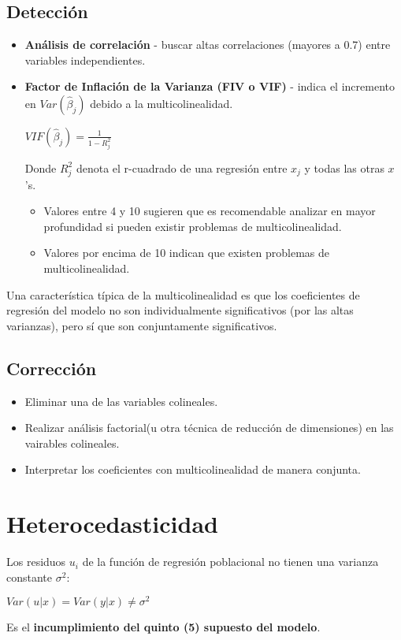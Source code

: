 \documentclass[10pt, a4paper, landscape]{extarticle}
\begin{document}
\begin{multicols}{3}
	\subsection*{Detección}
		\begin{itemize}[leftmargin=*]
			\item \textbf{Análisis de correlación} - buscar altas correlaciones (mayores a 0.7) entre variables independientes.
			\item \textbf{Factor de Inflación de la Varianza (FIV o VIF)} - indica el incremento en $Var(\hat{\beta}_j)$ debido a la multicolinealidad.
			\begin{center}
				$VIF(\hat{\beta}_j) = \frac{1}{1-R_j^2}$
			\end{center}
			Donde $R^2_j$ denota el r-cuadrado de una regresión entre $x_j$ y todas las otras $x$'s. 
			\begin{itemize}[leftmargin=*]
				\item Valores entre 4 y 10 sugieren que es recomendable analizar en mayor profundidad si pueden existir problemas de multicolinealidad.
				\item Valores por encima de 10 indican que existen problemas de multicolinealidad.
			\end{itemize}
		\end{itemize}
		Una característica típica de la multicolinealidad es que los coeficientes de regresión del modelo no son individualmente significativos (por las altas varianzas), pero sí que son conjuntamente significativos.
	\subsection*{Corrección}
		\begin{itemize}[leftmargin=*]
			\item Eliminar una de las variables colineales.
			\item Realizar análisis factorial(u otra técnica de reducción de dimensiones) en las vairables colineales.
			\item Interpretar los coeficientes con multicolinealidad de manera conjunta.
		\end{itemize}
\columnbreak
\section*{Heterocedasticidad}
	Los residuos $u_i$ de la función de regresión poblacional no tienen una varianza constante $\sigma^2$:
	\begin{center}
		$Var(u|x) = Var(y|x) \neq \sigma^2$
	\end{center}
	Es el \textbf{incumplimiento del quinto (5) supuesto del modelo}.

\end{multicols}
\end{document}
